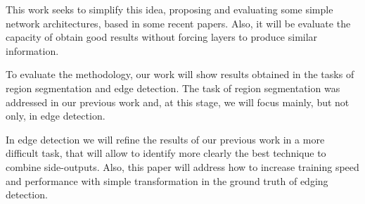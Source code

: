{\color{blue}
This work seeks to simplify this idea, proposing and evaluating some simple network architectures, based in some recent papers.
Also, it will be evaluate the capacity of obtain good results without forcing layers to produce similar information.

To evaluate the methodology, our work will show results obtained in the tasks of region segmentation and edge detection.
The task of region segmentation was addressed in our previous work \cite{Reis:2019} and, at this stage, we will focus mainly, but not only, in edge detection.
}

In edge detection we will refine the results of our previous work in a more difficult task, that will allow to identify more clearly the best technique to combine side-outputs.
Also, this paper will address how to increase training speed and performance with simple transformation in the ground truth of edging detection.

